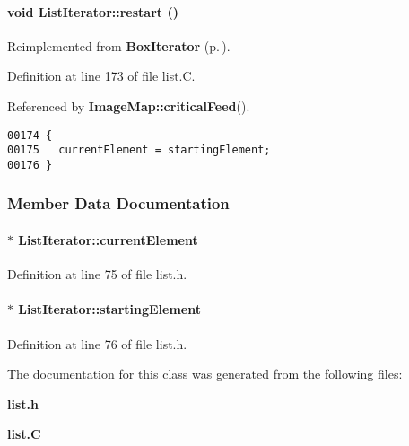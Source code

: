 \paragraph{\setlength{\rightskip}{0pt plus 5cm}void List\-Iterator::restart ()\hspace{0.3cm}{\tt  [virtual]}}\hfill



Reimplemented from {\bf Box\-Iterator} {\rm (p.\,\pageref{BoxIterator_a6})}.

Definition at line 173 of file list.C.

Referenced by {\bf Image\-Map::critical\-Feed}().\small\begin{verbatim}00174 {
00175   currentElement = startingElement;
00176 }
\end{verbatim}\normalsize 


\subsubsection{Member Data Documentation}
\label{ListIterator_o0}
\paragraph{ $\ast$ List\-Iterator::current\-Element\hspace{0.3cm}{\tt  [private]}}\hfill



Definition at line 75 of file list.h.\label{ListIterator_o1}
\paragraph{ $\ast$ List\-Iterator::starting\-Element\hspace{0.3cm}{\tt  [private]}}\hfill



Definition at line 76 of file list.h.

The documentation for this class was generated from the following files:\begin{CompactItemize}
\item 
{\bf list.h}\item 
{\bf list.C}\end{CompactItemize}
